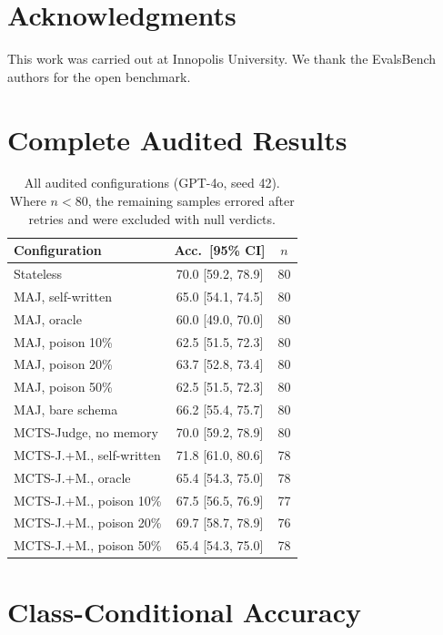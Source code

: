 \documentclass[11pt]{article}
\begin{document}
\section*{Acknowledgments}
This work was carried out at Innopolis University. We thank the EvalsBench authors for the open benchmark.



\appendix

\section{Complete Audited Results}
\label{app:full}

\begin{table}[h]
\centering
\small
\begin{tabular}{lcc}
\toprule
Configuration & Acc.\ [95\% CI] & $n$ \\
\midrule
Stateless & 70.0 [59.2, 78.9] & 80 \\
MAJ, self-written & 65.0 [54.1, 74.5] & 80 \\
MAJ, oracle & 60.0 [49.0, 70.0] & 80 \\
MAJ, poison 10\% & 62.5 [51.5, 72.3] & 80 \\
MAJ, poison 20\% & 63.7 [52.8, 73.4] & 80 \\
MAJ, poison 50\% & 62.5 [51.5, 72.3] & 80 \\
MAJ, bare schema & 66.2 [55.4, 75.7] & 80 \\
MCTS-Judge, no memory & 70.0 [59.2, 78.9] & 80 \\
MCTS-J.+M., self-written & 71.8 [61.0, 80.6] & 78 \\
MCTS-J.+M., oracle & 65.4 [54.3, 75.0] & 78 \\
MCTS-J.+M., poison 10\% & 67.5 [56.5, 76.9] & 77 \\
MCTS-J.+M., poison 20\% & 69.7 [58.7, 78.9] & 76 \\
MCTS-J.+M., poison 50\% & 65.4 [54.3, 75.0] & 78 \\
\bottomrule
\end{tabular}
\caption{All audited configurations (GPT-4o, seed 42). Where $n<80$, the remaining samples errored after retries and were excluded with null verdicts.}
\label{tab:appfull}
\end{table}

\section{Class-Conditional Accuracy}
\label{app:class}
\end{document}

